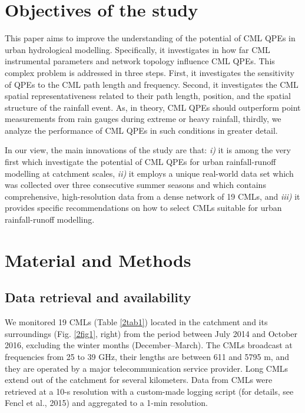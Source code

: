 \documentclass{ctuthesis}\usepackage[]{graphicx}\usepackage[]{color}
\begin{document}
\section{Objectives of the study}

This paper aims to improve the understanding of the potential of CML QPEs in urban hydrological modelling. Specifically, it investigates in how far CML instrumental parameters and network topology influence CML QPEs. This complex problem is addressed in three steps. First, it investigates the sensitivity of QPEs to the CML path length and frequency. Second, it investigates the CML spatial representativeness related to their path length, position, and the spatial structure of the rainfall event. As, in theory, CML QPEs should outperform point measurements from rain gauges during extreme or heavy rainfall, thirdly, we analyze the performance of CML QPEs in such conditions in greater detail. 

In our view, the main innovations of the study are that: \emph{i)} it is among the very first which investigate the potential of CML QPEs for urban rainfall-runoff modelling at catchment scales, \emph{ii)} it employs a unique real-world data set which was collected over three consecutive summer seasons and which contains comprehensive, high-resolution data from a dense network of 19 CMLs, and \emph{iii)} it provides specific recommendations on how to select CMLs suitable for urban rainfall-runoff modelling.

 
\section{Material and Methods} \label{paperIMnM}

\subsection{Data retrieval and availability} \label{DatAva}

We monitored 19 CMLs (Table \ref{2tab1}) located in the catchment and its surroundings (Fig. \ref{2fig1}, right) from the period between July 2014 and October 2016, excluding the winter months (December--March). The CMLs broadcast at frequencies from 25 to 39 GHz, their lengths are between 611 and 5795 m, and they are operated by a major telecommunication service provider. Long CMLs extend out of the catchment for several kilometers. Data from CMLs were retrieved at a 10-s resolution with a custom-made logging script (for details, see Fencl et al., 2015) and aggregated to a 1-min resolution.
\end{document}
